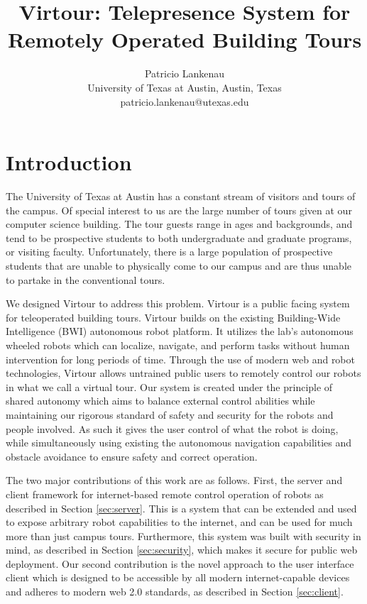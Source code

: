 \documentclass[
  oneside,
  11pt, a4paper,
  footinclude=true,
  headinclude=true,
  cleardoublepage=empty
]{article}
\title{Virtour: Telepresence System for Remotely Operated Building Tours}
\author{Patricio Lankenau\\
        University of Texas at Austin, Austin, Texas\\
        patricio.lankenau@utexas.edu\\}
\date{}
\begin{document}
\maketitle

\tableofcontents
\newpage

\section{Introduction}\label{sec:intro}

The University of Texas at Austin has a constant stream of visitors and tours
of the campus. Of special interest to us are the large number of tours given at
our computer science building. The tour guests range in ages and backgrounds,
and tend to be prospective students to both undergraduate and graduate programs,
or visiting faculty. Unfortunately, there is a large population of prospective
students that are unable to physically come to our campus and are thus unable
to partake in the conventional tours.

We designed Virtour to address this problem. Virtour is a public facing system
for teleoperated building tours. Virtour builds on the existing Building-Wide
Intelligence (BWI) autonomous robot platform. It utilizes the lab's autonomous
wheeled robots which can localize, navigate, and perform tasks without human
intervention for long periods of time. Through the use of modern web and robot
technologies, Virtour allows untrained public users to remotely control our
robots in what we call a virtual tour. Our system is created under the
principle of shared autonomy which aims to balance external control abilities
while maintaining our rigorous standard of safety and security for the robots
and people involved. As such it gives the user control of what the robot is
doing, while simultaneously using existing the autonomous navigation
capabilities and obstacle avoidance to ensure safety and correct operation.

The two major contributions of this work are as follows. First, the server and
client framework for internet-based remote control operation of robots as
described in Section \ref{sec:server}. This is a system that can be extended
and used to expose arbitrary robot capabilities to the internet, and can be
used for much more than just campus tours. Furthermore, this system was built
with security in mind, as described in Section \ref{sec:security}, which makes
it secure for public web deployment. Our second contribution is the novel
approach to the user interface client which is designed to be accessible by all
modern internet-capable devices and adheres to modern web 2.0 standards, as
described in Section \ref{sec:client}.
\end{document}
